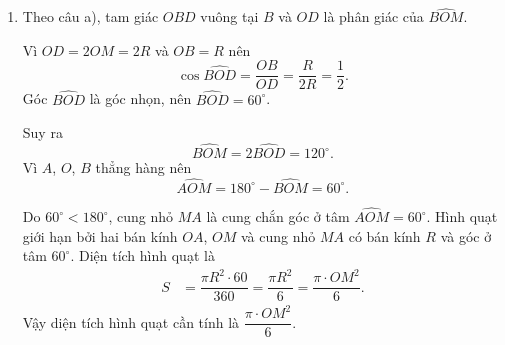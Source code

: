 \begin{bt}[3,0 điểm]
{\begin{enumerate}
Từ đó
\[
\dfrac{AH}{BH}
=\dfrac{AM^2}{BM^2}
=\dfrac{(2R\sin\alpha)^2}{(2R\cos\alpha)^2}
=\tan^2\alpha.
\]

Theo câu a), $AC=R\tan\alpha$ và $BD=R\cot\alpha$, nên
\[
\dfrac{AC}{BD}
=\dfrac{R\tan\alpha}{R\cot\alpha}
=\tan^2\alpha.
\]
Vậy
\[
\dfrac{AH}{BH}=\dfrac{AC}{BD}. \tag{1}
\]

Vì $OA\perp Ax$, $OB\perp By$ và $A$, $O$, $B$ thẳng hàng nên $Ax\parallel By$. Do đó $AC\parallel BD$.

Xét $\triangle ACN$ và $\triangle DBN$:
\begin{itemize}
\item $\widehat{CAN}=\widehat{BDN}$ (so le trong, $AC\parallel BD$, cát tuyến $AD$);
\item $\widehat{ACN}=\widehat{DBN}$ (so le trong, $AC\parallel BD$, cát tuyến $BC$).
\end{itemize}
Suy ra $\triangle ACN\backsim\triangle DBN$ (g.g). Do đó
\[
\dfrac{AN}{DN}=\dfrac{AC}{BD}.
\]
Kết hợp với $(1)$, ta được
\[
\dfrac{AN}{DN}=\dfrac{AH}{BH}.
\]
Suy ra
\begin{align*}
\dfrac{AN}{AD}
&=\dfrac{AN}{AN+DN}
=\dfrac{1}{1+\dfrac{DN}{AN}}
=\dfrac{1}{1+\dfrac{BH}{AH}}\\
&=\dfrac{AH}{AH+BH}
=\dfrac{AH}{AB}. \tag{2}
\end{align*}

Gọi $\ell$ là đường thẳng đi qua $N$ và vuông góc với $AB$, cắt $AB$ tại $P$. Ba đường thẳng $Ax$, $\ell$ và $By$ cùng vuông góc với $AB$ nên song song với nhau. Cát tuyến $AD$ cắt ba đường thẳng này lần lượt tại $A$, $N$, $D$; cát tuyến $AB$ cắt chúng lần lượt tại $A$, $P$, $B$.

Theo định lý Thalès,
\[
\dfrac{AN}{AD}=\dfrac{AP}{AB}.
\]
Kết hợp với $(2)$ suy ra $AP=AH$. Vì $P$ và $H$ cùng nằm trên đoạn thẳng $AB$ nên $P$ trùng $H$.

Vậy $\ell$ chính là đường thẳng $MH$, nên $N$ nằm trên $MH$. Do đó $MN\perp AB$.

\item Theo câu a), tam giác $OBD$ vuông tại $B$ và $OD$ là phân giác của $\widehat{BOM}$.

Vì $OD=2OM=2R$ và $OB=R$ nên
\[
\cos\widehat{BOD}=\dfrac{OB}{OD}=\dfrac{R}{2R}=\dfrac12.
\]
Góc $\widehat{BOD}$ là góc nhọn, nên $\widehat{BOD}=60^\circ$.

Suy ra
\[
\widehat{BOM}=2\widehat{BOD}=120^\circ.
\]
Vì $A$, $O$, $B$ thẳng hàng nên
\[
\widehat{AOM}=180^\circ-\widehat{BOM}=60^\circ.
\]

Do $60^\circ<180^\circ$, cung nhỏ $MA$ là cung chắn góc ở tâm $\widehat{AOM}=60^\circ$. Hình quạt giới hạn bởi hai bán kính $OA$, $OM$ và cung nhỏ $MA$ có bán kính $R$ và góc ở tâm $60^\circ$. Diện tích hình quạt là
\begin{align*}
S
&=\dfrac{\pi R^2\cdot 60}{360}
=\dfrac{\pi R^2}{6}
=\dfrac{\pi\cdot OM^2}{6}.
\end{align*}
Vậy diện tích hình quạt cần tính là $\dfrac{\pi\cdot OM^2}{6}$.
\end{enumerate}
}
\end{bt}
